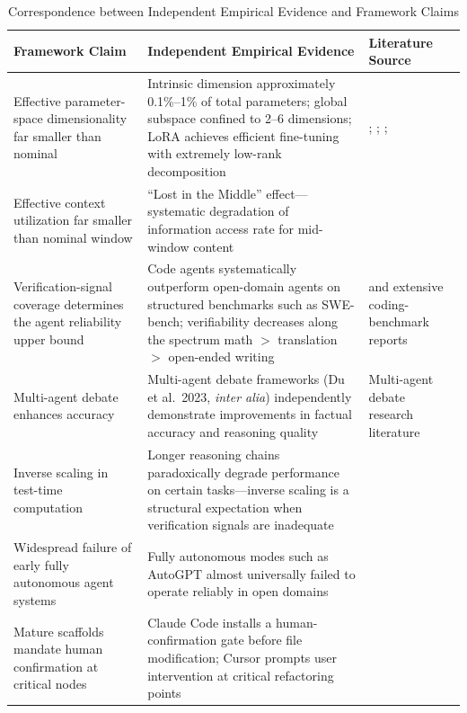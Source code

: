 \documentclass[11pt,a4paper]{article}
\theoremstyle{definition}
\begin{document}
\begin{table}[H]
\centering
\caption{Correspondence between Independent Empirical Evidence and Framework Claims}
\begin{tabular}{@{}p{4cm}p{5cm}p{4cm}@{}}
\toprule
\textbf{Framework Claim} & \textbf{Independent Empirical Evidence} & \textbf{Literature Source} \\
\midrule
Effective parameter-space dimensionality far smaller than nominal & Intrinsic dimension approximately 0.1\%--1\% of total parameters; global subspace confined to 2--6 dimensions; LoRA achieves efficient fine-tuning with extremely low-rank decomposition & \cite{li2018intrinsic}; \cite{aghajanyan2020intrinsic}; \cite{hu2021lora}; \cite{xu2026parameter} \\
Effective context utilization far smaller than nominal window & ``Lost in the Middle'' effect---systematic degradation of information access rate for mid-window content & \cite{liu2023lost} \\
Verification-signal coverage determines the agent reliability upper bound & Code agents systematically outperform open-domain agents on structured benchmarks such as SWE-bench; verifiability decreases along the spectrum math $>$ translation $>$ open-ended writing & \cite{claude_code_2025} and extensive coding-benchmark reports \\
Multi-agent debate enhances accuracy & Multi-agent debate frameworks (Du et al.\ 2023, \emph{inter alia}) independently demonstrate improvements in factual accuracy and reasoning quality & Multi-agent debate research literature \\
Inverse scaling in test-time computation & Longer reasoning chains paradoxically degrade performance on certain tasks---inverse scaling is a structural expectation when verification signals are inadequate & \cite{gema2025inverse} \\
Widespread failure of early fully autonomous agent systems & Fully autonomous modes such as AutoGPT almost universally failed to operate reliably in open domains & \cite{autogpt_failure_2024} \\
Mature scaffolds mandate human confirmation at critical nodes & Claude Code installs a human-confirmation gate before file modification; Cursor prompts user intervention at critical refactoring points & \cite{claude_code_2025} \\
\bottomrule
\end{tabular}
\end{table}
\end{document}
